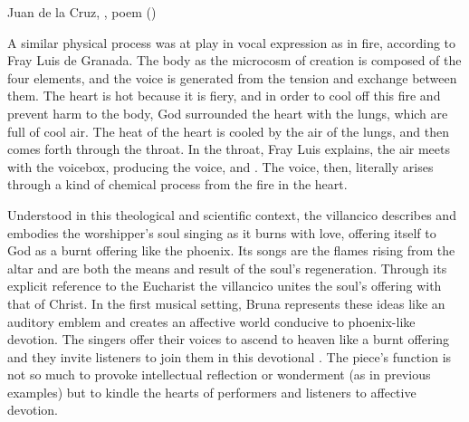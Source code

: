 {Juan de la Cruz, , poem ()}

A similar physical process was at play in vocal expression as in fire,
according to Fray Luis de Granada.
The body as the microcosm of creation is composed of the four elements, and the
voice is generated from the tension and exchange between them.
The heart is hot because it is fiery, and in order to cool off this fire and
prevent harm to the body, God surrounded the heart with the lungs, which are
full of cool air. 
The heat of the heart is cooled by the air of the lungs, and then comes forth
through the throat.
In the throat, Fray Luis explains, the air meets with the voicebox, producing
the voice, and .%
    \Autocite[435]{LuisdeGranada:Simbolo}
The voice, then, literally arises through a kind of chemical process from the
fire in the heart.
	
Understood in this theological and scientific context, the villancico
 describes and embodies the worshipper's soul singing
as it burns with love, offering itself to God as a burnt offering like the
phoenix.
Its songs are the flames rising from the altar and are both the means and
result of the soul's regeneration.
Through its explicit reference to the Eucharist the villancico unites the
soul's offering with that of Christ.
In the first musical setting, Bruna represents these ideas like an auditory
emblem and creates an affective world conducive to phoenix-like devotion.
The singers offer their voices to ascend to heaven like a burnt offering and
they invite listeners to join them in this devotional .
The piece's function is not so much to provoke intellectual reflection or
wonderment (as in previous examples) but to kindle the hearts of performers and
listeners to affective devotion.

